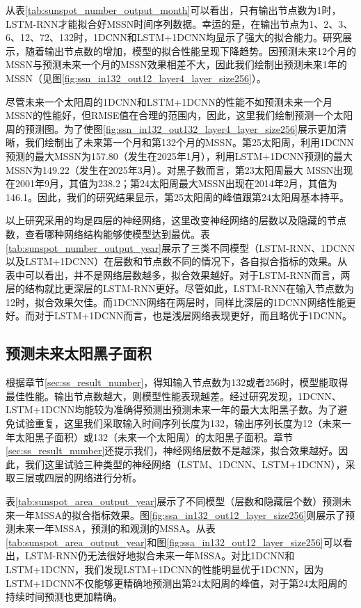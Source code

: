 从表\ref{tab:sunspot_number_output_month}可以看出，只有输出节点数为1时，LSTM-RNN才能拟合好MSSN时间序列数据。幸运的是，在输出节点为1、2、3、6、12、72、132时，1DCNN和LSTM+1DCNN均显示了强大的拟合能力。研究展示，随着输出节点数的增加，模型的拟合性能呈现下降趋势。因预测未来12个月的MSSN与预测未来一个月的MSSN效果相差不大，因此我们绘制出预测未来1年的MSSN（见图\ref{fig:ssn_in132_out12_layer4_layer_size256}）。

尽管未来一个太阳周的1DCNN和LSTM+1DCNN的性能不如预测未来一个月MSSN的性能好，但RMSE值在合理的范围内，因此，这里我们绘制预测一个太阳周的预测图。为了使图\ref{fig:ssn_in132_out132_layer4_layer_size256}展示更加清晰，我们绘制出了未来第一个月和第132个月的MSSN。第25太阳周，利用1DCNN预测的最大MSSN为157.80（发生在2025年1月），利用LSTM+1DCNN预测的最大MSSN为149.22（发生在2025年3月）。对黑子数而言，第23太阳周最大 MSSN出现在2001年9月，其值为238.2；第24太阳周最大MSSN出现在2014年2月，其值为146.1。因此，我们的研究结果显示，第25太阳周的峰值跟第24太阳周基本持平。 


以上研究采用的均是四层的神经网络，这里改变神经网络的层数以及隐藏的节点数，查看哪种网络结构能够使模型达到最优。表\ref{tab:sunspot_number_output_year}展示了三类不同模型（LSTM-RNN、1DCNN以及LSTM+1DCNN）在层数和节点数不同的情况下，各自拟合指标的效果。从表中可以看出，并不是网络层数越多，拟合效果越好。对于LSTM-RNN而言，两层的结构就比更深层的LSTM-RNN更好。尽管如此，LSTM-RNN在输入节点数为12时，拟合效果欠佳。而1DCNN网络在两层时，同样比深层的1DCNN网络性能更好。而对于LSTM+1DCNN而言，也是浅层网络表现更好，而且略优于1DCNN。



\subsection{预测未来太阳黑子面积}\label{sec:ss_result_area}
根据章节\ref{sec:ss_result_number}，得知输入节点数为132或者256时，模型能取得最佳性能。输出节点数越大，则模型性能表现越差。经过研究发现，1DCNN、LSTM+1DCNN均能较为准确得预测出预测未来一年的最大太阳黑子数。为了避免试验重复，这里我们采取输入时间序列长度为132，输出序列长度为12（未来一年太阳黑子面积）或132（未来一个太阳周）的太阳黑子面积。章节\ref{sec:ss_result_number}还提示我们，神经网络层数不是越深，拟合效果越好。因此，我们这里试验三种类型的神经网络（LSTM、1DCNN、LSTM+1DCNN），采取三层或四层的网络进行分析。


表\ref{tab:sunspot_area_output_year}展示了不同模型（层数和隐藏层个数）预测未来一年MSSA的拟合指标效果。图\ref{fig:ssa_in132_out12_layer_size256}则展示了预测未来一年MSSA，预测的和观测的MSSA。从表\ref{tab:sunspot_area_output_year}和图\ref{fig:ssa_in132_out12_layer_size256}可以看出，LSTM-RNN仍无法很好地拟合未来一年MSSA。对比1DCNN和LSTM+1DCNN，我们发现LSTM+1DCNN的性能明显优于1DCNN，因为LSTM+1DCNN不仅能够更精确地预测出第24太阳周的峰值，对于第24太阳周的持续时间预测也更加精确。

